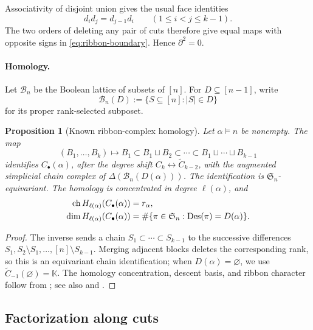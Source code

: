 \documentclass{amsart}
\newtheorem{proposition}[proposition]{Proposition}
\theoremstyle{definition}
\theoremstyle{remark}
\newcommand{\kk}{\mathbb{K}}
\newcommand{\Des}{\operatorname{Des}}
\begin{document}
Associativity of disjoint union gives the usual face identities
\[
 d_i d_j=d_{j-1}d_i\qquad(1\leq i<j\leq k-1).
\]
The two orders of deleting any pair of cuts therefore give equal maps with
opposite signs in \eqref{eq:ribbon-boundary}.  Hence $\partial^2=0$.

\paragraph{Homology.}

Let $\mathcal B_n$ be the Boolean lattice of subsets of $[n]$.  For
$D\subseteq[n-1]$, write
\[
  \mathcal B_n(D):=\{S\subseteq[n]: |S|\in D\}
\]
for its proper rank-selected subposet.

\begin{proposition}[Known ribbon-complex homology]
\label{prop:classical-rank-selected-homology}
Let $\alpha\models n$ be nonempty.  The map
\[
  (B_1,\ldots,B_k)
  \longmapsto
  B_1\subset B_1\sqcup B_2\subset\cdots\subset
  B_1\sqcup\cdots\sqcup B_{k-1}
\]
identifies $C_\bullet(\alpha)$, after the degree shift
$C_k\leftrightarrow\widetilde C_{k-2}$, with the augmented simplicial chain
complex of $\Delta(\mathcal B_n(D(\alpha)))$.  The identification is
$\mathfrak S_n$-equivariant.  The homology is concentrated in degree
$\ell(\alpha)$, and
\begin{align}
 \operatorname{ch}H_{\ell(\alpha)}(C_\bullet(\alpha))&=r_\alpha,\notag\\
 \dim H_{\ell(\alpha)}(C_\bullet(\alpha))
 &=\#\{\pi\in\mathfrak S_n:\Des(\pi)=D(\alpha)\}.
 \label{eq:classical-descent-homology}
\end{align}
\end{proposition}

\begin{proof}
The inverse sends a chain
$S_1\subset\cdots\subset S_{k-1}$ to the successive differences
$S_1,S_2\setminus S_1,\ldots,[n]\setminus S_{k-1}$.  Merging adjacent blocks
deletes the corresponding rank, so this is an equivariant chain
identification; when $D(\alpha)=\varnothing$, we use
$\widetilde C_{-1}(\varnothing)=\kk$.  The homology concentration, descent
basis, and ribbon character follow from
\cite[Theorem~4.2, Theorem~6.6, and Proposition~7.3]{EhrenborgJung2013}; see
also \cite[Theorem~4.3]{Stanley1982GroupsPosets} and
\cite[Theorem~3.4.4]{Wachs2007}.
\end{proof}

\subsection{Factorization along cuts}
\label{subsec:abstract-factorization}
\end{document}
